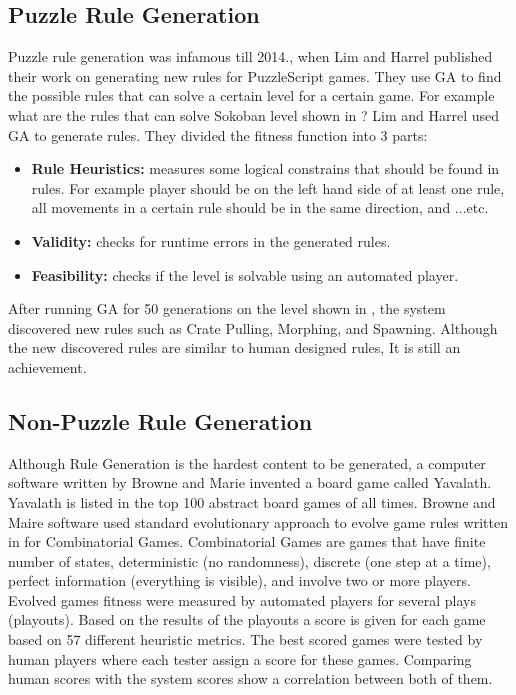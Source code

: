 \subsection{Puzzle Rule Generation}
Puzzle rule generation was infamous till 2014., when Lim and Harrel\cite{puzzleScriptGeneration} published their work on generating new rules for PuzzleScript games. They use GA to find the possible rules that can solve a certain level for a certain game. For example what are the rules that can solve Sokoban level shown in ? Lim and Harrel used GA to generate rules. They divided the fitness function into 3 parts:
\begin{itemize} \itemsep0pt \parskip0pt 
	\item \textbf{Rule Heuristics:} measures some logical constrains that should be found in rules. For example player should be on the left hand side of at least one rule, all movements in a certain rule should be in the same direction, and ...etc.
	\item \textbf{Validity:} checks for runtime errors in the generated rules.
	\item \textbf{Feasibility:} checks if the level is solvable using an automated player.
\end{itemize}
After running GA for 50 generations on the level shown in , the system discovered new rules such as Crate Pulling, Morphing, and Spawning. Although the new discovered rules are similar to human designed rules, It is still an achievement.


\subsection{Non-Puzzle Rule Generation}
Although Rule Generation is the hardest content to be generated, a computer software written by Browne and Marie invented a board game called Yavalath. Yavalath is listed in the top 100 abstract board games of all times\cite{yavalath}. Browne and Maire software\cite{evolveBrowne} used standard evolutionary approach to evolve game rules written in  for Combinatorial Games. Combinatorial Games are games that have finite number of states, deterministic (no randomness), discrete (one step at a time), perfect information (everything is visible), and involve two or more players. Evolved games fitness were measured by automated players for several plays (playouts). Based on the results of the playouts a score is given for each game based on 57 different heuristic metrics. The best scored games were tested by human players where each tester assign a score for these games. Comparing human scores with the system scores show a correlation between both of them.\\\par

